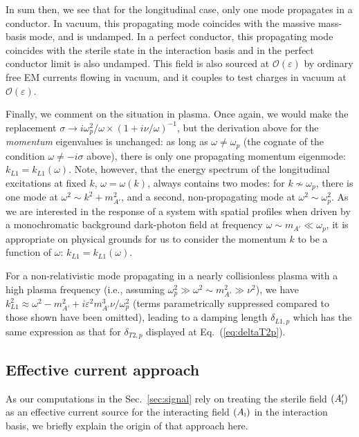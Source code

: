 \documentclass[amsmath,amssymb,aps,10pt,prd,letterpaper,nofootinbib,balancelastpage,notitlepage,superscriptaddress,twocolumn,floatfix]{revtex4-2}
\newcommand{\secref}[2][]{Sec{#1}.~\ref{#2}}		%
\renewcommand{\eqref}[2][]{Eq{#1}.~(\ref{eq:#2})}	%
\newcommand{\inter}[1]{({#1}_{\textsc{i}})}
\newcommand{\primeinter}[1]{({#1}_{\textsc{i}}^\prime)}
\begin{document}
In sum then, we see that for the longitudinal case, only one mode propagates in a conductor.
In vacuum, this propagating mode coincides with the massive mass-basis mode, and is undamped.
In a perfect conductor, this propagating mode coincides with the sterile state in the interaction basis and in the perfect conductor limit is also undamped.
This field is also sourced at $\mathcal{O}(\varepsilon)$ by ordinary free EM currents flowing in vacuum, and it couples to test charges in vacuum at $\mathcal{O}(\varepsilon)$.

Finally, we comment on the situation in plasma.
Once again, we would make the replacement $\sigma \rightarrow i \omega_p^2/\omega \times ( 1+i\nu/\omega )^{-1}$, but the derivation above for the \emph{momentum} eigenvalues is unchanged: as long as $\omega \neq \omega_p$ (the cognate of the condition $\omega \neq -i\sigma$ above), there is only one propagating momentum eigenmode: $k_{L1}=k_{L1}(\omega)$.
Note, however, that the energy spectrum of the longitudinal excitations at fixed $k$, $\omega = \omega(k)$, always contains two modes: for $k \not\sim \omega_p$, there is one mode at $\omega^2 \sim k^2 + m_{A'}^2$, and a second, non-propagating mode at $\omega^2 \sim \omega_p^2$.
As we are interested in the response of a system with spatial profiles when driven by a monochromatic background dark-photon field at frequency $\omega \sim m_{A'} \ll \omega_p$, it is appropriate on physical grounds for us to consider the momentum $k$ to be a function of $\omega$: $k_{L1}=k_{L1}(\omega)$.

For a non-relativistic mode propagating in a nearly collisionless plasma with a high plasma frequency (i.e., assuming $\omega_p^2 \gg \omega^2 \sim m_{A'}^2 \gg \nu^2$), we have $k_{L1}^2 \approx \omega^2-m_{A'}^2 + i \varepsilon^2 m_{A'}^3\nu/\omega_p^2$ (terms parametrically suppressed compared to those shown have been omitted), leading to a damping length $\delta_{L1,p}$ which has the same expression as that for $\delta_{T2,p}$ displayed at \eqref{deltaT2p}.


\subsection{Effective current approach}
\label{app:effectiveCurrent}

As our computations in the \secref{sec:signal} rely on treating the sterile field $\primeinter{A}$ as an effective current source for the interacting field $\inter{A}$ in the interaction basis, we briefly explain the origin of that approach here.
\end{document}
